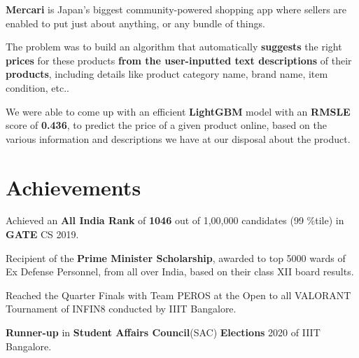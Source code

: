 \documentclass[]{essdee-resume}
\begin{document}
\begin{minipage}[t]{0.66\textwidth}
\begin{tightemize}
\item \textbf{Mercari} is Japan’s biggest community-powered shopping app where sellers are enabled to put just about anything, or any bundle of things.
\item The problem was to build an algorithm that automatically \textbf{suggests} the right \textbf{prices} for these products \textbf{from the user-inputted text descriptions} of their \textbf{products}, including details like product category name, brand name, item condition, etc..
\item We  were  able  to  come up  with  an  efficient \textbf{LightGBM} model  with an  \textbf{RMSLE} score of \textbf{0.436}, to predict the price of a given product online, based on the various information and descriptions we have at our disposal about the product.
\end{tightemize}
\sectionsep







\section{Achievements} 
\vspace{\topsep}    %
\begin{tightemize}
\item Achieved an \textbf{All India Rank} of \textbf{1046} out of 1,00,000 candidates (99 \%tile) in 
\textbf{GATE} CS 2019.
\item Recipient of the \textbf{Prime Minister Scholarship}, awarded to top 5000 wards of Ex Defense Personnel, from all over India, based on their class XII board results.
\item Reached the Quarter Finals with Team PEROS at the Open to all VALORANT Tournament of INFIN8 conducted by IIIT Bangalore.
\item \textbf{Runner-up} in \textbf{Student Affairs Council}(SAC) \textbf{Elections} 2020 of IIIT Bangalore.
\end{tightemize}


\end{minipage} 
\end{document}
